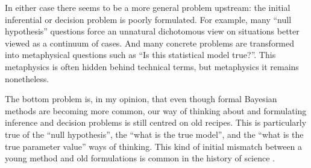 \documentclass[\ifafour a4paper,12pt,\else a5paper,10pt,\fi%
onecolumn,oneside,article,%
british%
]{memoir}
\theoremstyle{remark}
\theoremstyle{innote}
\newcommand*{\citep}{\parencites}
\renewcommand*{\|}{\mathpunct{|}}
\begin{document}
In either case there seems to be a more general problem upstream: the
initial inferential or decision problem is poorly formulated. For example,
many \enquote{null hypothesis} questions force an unnatural dichotomous
view on situations better viewed as a continuum of cases. And many concrete
problems are transformed into metaphysical questions such as \enquote{Is this
  statistical model true?}. This metaphysics is often hidden behind
technical terms, but metaphysics it remains nonetheless.

The bottom problem is, in my opinion, that even though formal Bayesian
methods are becoming more common, our way of thinking about and formulating
inference and decision problems is still centred on old recipes. This is
particularly true of the \enquote{null hypothesis}, the \enquote{what is
  the true model}, and the \enquote{what is the true parameter value} ways of
thinking. This kind of initial mismatch between a young method and old
formulations is common in the history of science
\citep{truesdell1968,kline1980_r1982,brush1976c_r1986,brush1976d_r1999,whittaker1910_r1951,whittaker1953}.
\end{document}
